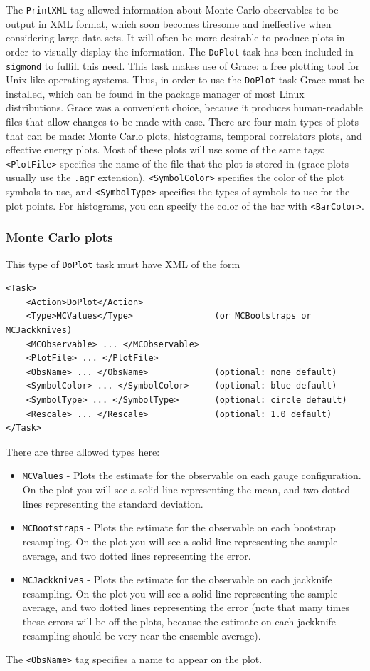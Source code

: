 \documentclass[12pt]{article}
\newcommand{\vb}{\texttt}
\begin{document}
The \vb{PrintXML} tag allowed information about Monte Carlo observables to be output
in XML format, which soon becomes tiresome and ineffective when considering large data sets.
It will often be more desirable to produce plots in order to visually display the information.
The \vb{DoPlot} task has been included in \vb{sigmond} to fulfill this need. This task makes
use of \href{http://plasma-gate.weizmann.ac.il/Grace/}{Grace}: a free plotting tool
for Unix-like operating systems. Thus, in order to use the \vb{DoPlot} task Grace must
be installed, which can be found in the package manager of most Linux distributions.
Grace was a convenient choice, because it produces human-readable files that allow
changes to be made with ease.
There are four main types of plots that can be made: Monte Carlo plots,
histograms, temporal correlators plots, and effective energy plots.
Most of these plots will use some of the same tags: \vb{<PlotFile>}
specifies the name of the file that the plot is stored in (grace plots
usually use the \vb{.agr} extension), \vb{<SymbolColor>}
specifies the color of the plot symbols to use, and \vb{<SymbolType>}
specifies the types of symbols to use for the plot points.
For histograms, you can specify the color of the bar
with \vb{<BarColor>}.

\subsubsection{Monte Carlo plots}
This type of \vb{DoPlot} task must have XML of the form
\begin{verbatim}
<Task>
    <Action>DoPlot</Action>
    <Type>MCValues</Type>                (or MCBootstraps or MCJackknives)
    <MCObservable> ... </MCObservable>
    <PlotFile> ... </PlotFile>
    <ObsName> ... </ObsName>             (optional: none default)
    <SymbolColor> ... </SymbolColor>     (optional: blue default)
    <SymbolType> ... </SymbolType>       (optional: circle default)
    <Rescale> ... </Rescale>             (optional: 1.0 default)
</Task>
\end{verbatim}
There are three allowed types here:
\begin{itemize}
\item \vb{MCValues} - Plots the estimate for the observable on each gauge configuration. On the
  plot you will see a solid line representing the mean, and two dotted lines representing the
  standard deviation.
\item \vb{MCBootstraps} - Plots the estimate for the observable on each bootstrap resampling. On the
  plot you will see a solid line representing the sample average, and two dotted lines representing the
  error.
\item \vb{MCJackknives} - Plots the estimate for the observable on each jackknife resampling. On the
  plot you will see a solid line representing the sample average, and two dotted lines representing the
  error (note that many times these errors will be off the plots, because the estimate on each
  jackknife resampling should be very near the ensemble average).
\end{itemize}
The \vb{<ObsName>} tag specifies a name to appear on the plot.
\end{document}
